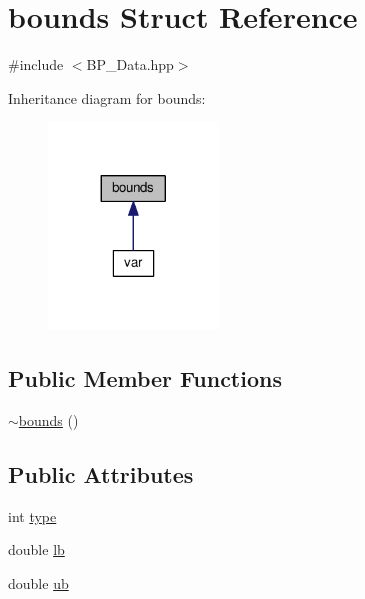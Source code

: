 \hypertarget{structbounds}{\section{bounds Struct Reference}
\label{structbounds}
}


{\ttfamily \#include $<$B\-P\-\_\-\-Data.\-hpp$>$}



Inheritance diagram for bounds\-:\nopagebreak
\begin{figure}[H]
\begin{center}
\leavevmode
\includegraphics[width=128pt]{structbounds__inherit__graph}
\end{center}
\end{figure}
\subsection*{Public Member Functions}
\begin{DoxyCompactItemize}
\item 
\hyperlink{structbounds_a8441bf308868cb8a69004ba7390a2a36}{$\sim$bounds} ()
\end{DoxyCompactItemize}
\subsection*{Public Attributes}
\begin{DoxyCompactItemize}
\item 
int \hyperlink{structbounds_aa7cba1824fe84287bd4218054fa99975}{type}
\item 
double \hyperlink{structbounds_a972c937ccb85a76f76f653f7fc22054e}{lb}
\item 
double \hyperlink{structbounds_aad20828a963e0779a3cd3eb94ca1fecd}{ub}
\end{DoxyCompactItemize}


